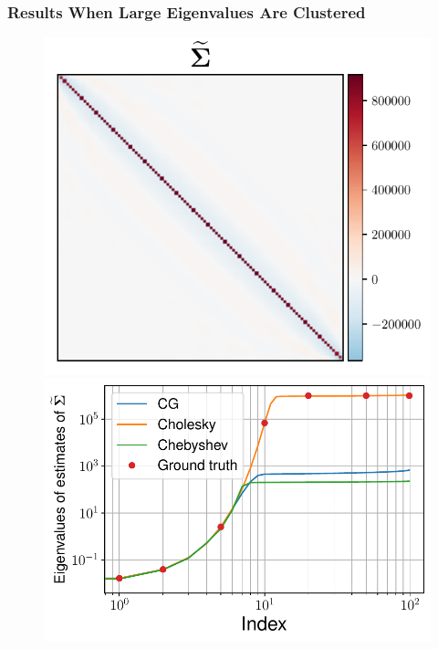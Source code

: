 \documentclass[aspectratio=169]{beamer}
\begin{document}
\begin{frame}
\frametitle{Results When Large Eigenvalues Are Clustered}
\begin{figure}
    \centering
    \mbox{{\includegraphics[scale=0.35]{src/images/simu1_ex1_invA.pdf}}}
    \mbox{{\includegraphics[scale=0.3]{src/images/simu1_ex1_eigvals_invA.pdf}}}
\end{figure}
\begin{figure}
    \centering

\end{figure}
\end{frame}
\end{document}
